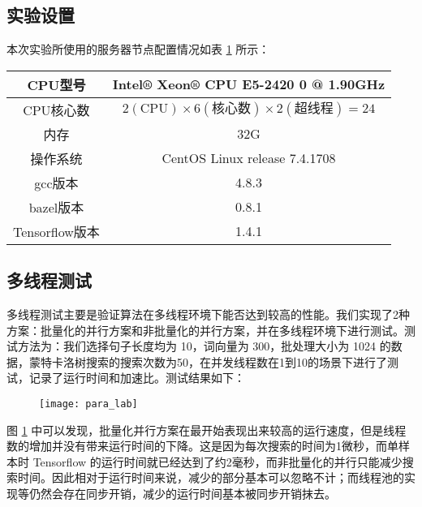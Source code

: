 \subsection{实验设置}
本次实验所使用的服务器节点配置情况如表 \ref{tab:exp_machine} 所示：

\begin{table}[H]
    \label{tab:exp_machine}
    \centering
    \footnotesize%
    \setlength{\tabcolsep}{4pt}%
    \renewcommand{\arraystretch}{1.2}%
    \begin{tabular}{|c|c|}
        \hline
        CPU型号 & Intel® Xeon® CPU E5-2420 0 @ 1.90GHz  \\
        \hline
        CPU核心数 & $2(\text{CPU}) \times 6(\text{核心数}) \times 2(\text{超线程}) = 24$ \\
        \hline
        内存 & 32G \\
        \hline
        操作系统 & CentOS Linux release 7.4.1708 \\
        \hline
        gcc版本 & 4.8.3\\
        \hline
        bazel版本 & 0.8.1 \\
        \hline
        Tensorflow版本 & 1.4.1\\
        \hline
    \end{tabular}{}
\end{table}

\subsection{多线程测试}
多线程测试主要是验证算法在多线程环境下能否达到较高的性能。我们实现了2种方案：批量化的并行方案和非批量化的并行方案，并在多线程环境下进行测试。测试方法为：我们选择句子长度均为 10，词向量为 300，批处理大小为 1024 的数据，蒙特卡洛树搜索的搜索次数为50，在并发线程数在1到10的场景下进行了测试，记录了运行时间和加速比。测试结果如下：

\begin{figure}[!htbp]
    \centering
    \texttt{[image: para\_lab]}
    \label{fig:para_lab}
\end{figure}

图 \ref{fig:para_lab} 中可以发现，批量化并行方案在最开始表现出来较高的运行速度，但是线程数的增加并没有带来运行时间的下降。这是因为每次搜索的时间为1微秒，而单样本时 Tensorflow 的运行时间就已经达到了约2毫秒，而非批量化的并行只能减少搜索时间。因此相对于运行时间来说，减少的部分基本可以忽略不计；而线程池的实现等仍然会存在同步开销，减少的运行时间基本被同步开销抹去。

